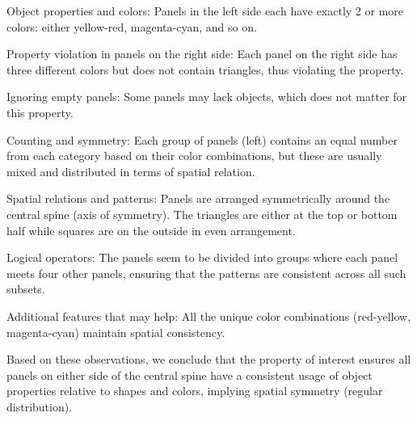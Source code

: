 \begin{tcolorbox}[breakable,enhanced jigsaw,opacityback=0,]
\begin{dialogue}
		Object properties and colors:
		Panels in the left side each have exactly 2 or more colors: either yellow-red, magenta-cyan, and so on.
		
		Property violation in panels on the right side:
		Each panel on the right side has three different colors but does not contain triangles, thus violating the property.
		
		Ignoring empty panels:
		Some panels may lack objects, which does not matter for this property.
		
		Counting and symmetry:
		Each group of panels (left) contains an equal number from each category based on their color combinations, but these are usually mixed and distributed in terms of spatial relation.
		
		Spatial relations and patterns:
		Panels are arranged symmetrically around the central spine (axis of symmetry).
		The triangles are either at the top or bottom half while squares are on the outside in even arrangement.
		
		Logical operators:
		The panels seem to be divided into groups where each panel meets four other panels, ensuring that the patterns are consistent across all such subsets.
		
		Additional features that may help:
		All the unique color combinations (red-yellow, magenta-cyan) maintain spatial consistency.
		
		Based on these observations, we conclude that the property of interest ensures all panels on either side of the central spine have a consistent usage of object properties relative to shapes and colors, implying spatial symmetry (regular distribution).
	\end{dialogue}
	\label{fig:task17-bongard}
\end{tcolorbox}





